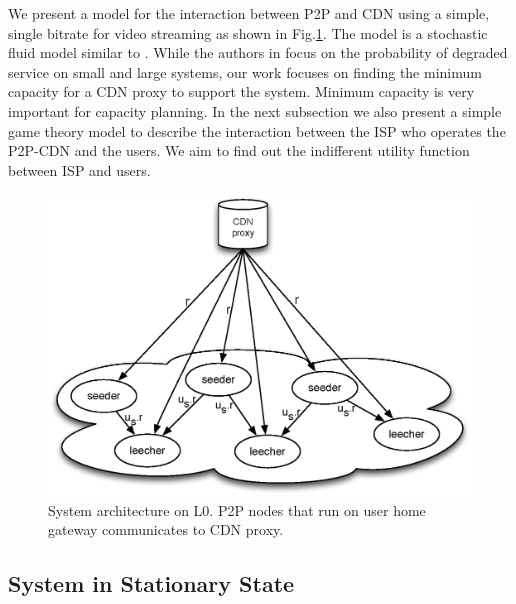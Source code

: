 \documentclass[paper]{ieice}
\begin{document}
We present a model for the interaction between P2P and CDN using a
simple, single bitrate for video streaming as shown in
Fig.\ref{fig:twotier2}.  The model is a stochastic fluid model similar
to \cite{4215694}.  While the authors in \cite{4215694} focus on the
probability of degraded service on small and large systems, our work
focuses on finding the minimum capacity for a CDN proxy to support the
system.  Minimum capacity is very important for capacity planning.  In
the next subsection we also present a simple game theory model to
describe the interaction between the ISP who operates the P2P-CDN and
the users.  We aim to find out the indifferent utility function
between ISP and users.

\begin{figure}[tb] 
\begin{center}
\includegraphics[scale=0.4]{graphs/two-tier-cdn-topology-2.eps}
\end{center}
\caption{System architecture on L0. P2P nodes that run on user home gateway communicates to CDN proxy.}
\label{fig:twotier2}
\vspace{-2mm}
\end{figure}

\subsection{System in Stationary State}
\end{document}
